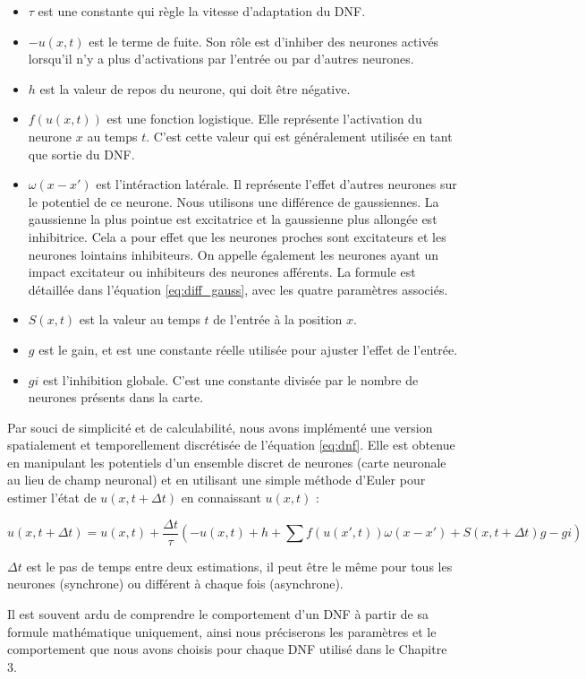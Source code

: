	\begin{itemize}
    	\item $\tau$ est une constante qui règle la vitesse d'adaptation du DNF.
    	\item $-u(x,t)$ est le terme de fuite. Son rôle est d'inhiber des neurones activés lorsqu'il n'y a plus d'activations par l'entrée ou par d'autres neurones.
		\item $h$ est la valeur de repos du neurone, qui doit être négative.
		\item $f(u(x,t))$ est une fonction logistique. Elle représente l'activation du neurone $x$ au temps $t$. C'est cette valeur qui est généralement utilisée en tant que sortie du DNF.
		\item $\omega(x-x')$ est l'intéraction latérale. Il représente l'effet d'autres neurones sur le potentiel de ce neurone. Nous utilisons une différence de gaussiennes. La gaussienne la plus pointue est excitatrice et la gaussienne plus allongée est inhibitrice. Cela a pour effet que les neurones proches sont excitateurs et les neurones lointains inhibiteurs. On appelle également les neurones ayant un impact excitateur ou inhibiteurs des neurones afférents. La formule est détaillée dans l'équation \ref{eq:diff_gauss}, avec les quatre paramètres associés.
		\item $S(x,t)$ est la valeur au temps $t$ de l'entrée à la position $x$.
		\item $g$ est le gain, et est une constante réelle utilisée pour ajuster l'effet de l'entrée.
		\item $gi$ est l'inhibition globale. C'est une constante divisée par le nombre de neurones présents dans la carte. 

	\end{itemize}

	Par souci de simplicité et de calculabilité, nous avons implémenté une version spatialement et temporellement discrétisée de l'équation \ref{eq:dnf}. Elle est obtenue en manipulant les potentiels d'un ensemble discret de neurones (carte neuronale au lieu de champ neuronal) et en utilisant une simple méthode d'Euler pour estimer l'état de $u(x,t+\Delta t)$ en connaissant $u(x,t)$ :

	\begin{equation}
		u(x, t+\Delta t) = u(x, t) +\frac{\Delta t}{\tau}\left(-u(x, t)+ h + \sum f(u(x', t))\omega(x-x') + S(x, t+\Delta t)g - gi\right)
	\end{equation}

	$\Delta t$ est le pas de temps entre deux estimations, il peut être le même pour tous les neurones (synchrone) ou différent à chaque fois (asynchrone).

	Il est souvent ardu de comprendre le comportement d'un DNF à partir de sa formule mathématique uniquement, ainsi nous préciserons les paramètres et le comportement que nous avons choisis pour chaque DNF utilisé dans le Chapitre 3.


